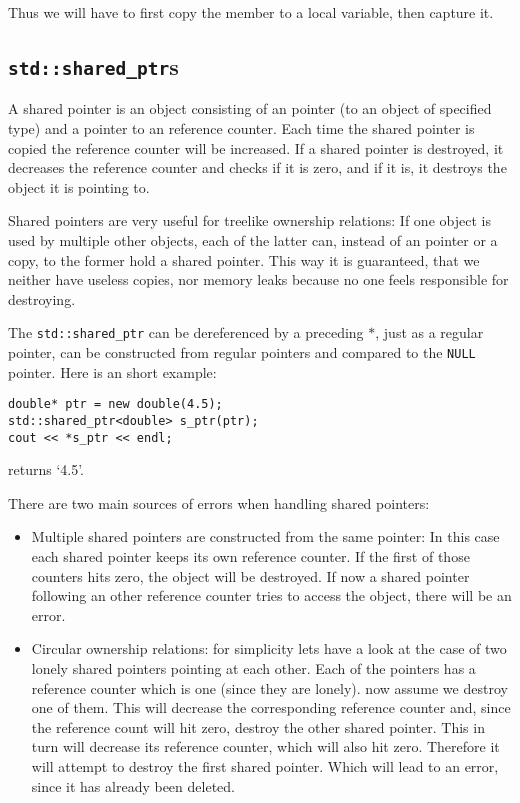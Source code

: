 \documentclass{article}
\newcommand{\code}[1]{\texttt{#1}}
\newcommand{\NULL}{\texttt{NULL} pointer\xspace}
\begin{document}
Thus we will have to first copy the member to a local variable, then capture it.

\subsection{\code{std::shared\_ptr}s}

A shared pointer is an object consisting of an pointer (to an object of specified type) and a pointer to an reference counter. Each time the shared pointer is copied the reference counter will be increased. If a shared pointer is destroyed, it decreases the reference counter and checks if it is zero, and if it is, it destroys the object it is pointing to.

Shared pointers are very useful for treelike ownership relations: If one object is used by multiple other objects, each of the latter can, instead of an pointer or a copy, to the former hold a shared pointer. This way it is guaranteed, that we neither have useless copies, nor memory leaks because no one feels responsible for destroying.

The \code{std::shared\_ptr} can be dereferenced by a preceding $*$, just as a regular pointer, can be constructed from regular pointers and compared to the \NULL. Here is an short example:

\begin{lstlisting}
double* ptr = new double(4.5);
std::shared_ptr<double> s_ptr(ptr);
cout << *s_ptr << endl;
\end{lstlisting}
returns \lq 4.5\rq.

There are two main sources of errors when handling shared pointers:
\begin{itemize}
\item Multiple shared pointers are constructed from the same pointer: In this case each shared pointer keeps its own reference counter. If the first of those counters hits zero, the object will be destroyed. If now a shared pointer following an other reference counter tries to access the object, there will be an error.
\item Circular ownership relations: for simplicity lets have a look at the case of two lonely shared pointers pointing at each other. Each of the pointers has a reference counter which is one (since they are lonely). now assume we destroy one of them. This will decrease the corresponding reference counter and, since the reference count will hit zero, destroy the other shared pointer. This in turn will decrease its reference counter, which will also hit zero. Therefore it will attempt to destroy the first shared pointer. Which will lead to an error, since it has already been deleted.
\end{itemize}
\end{document}
